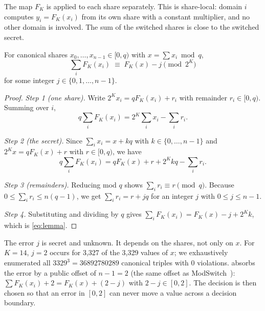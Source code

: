 The map $F_K$ is applied to each share separately. This is share-local: domain $i$ computes $y_i = F_K(x_i)$ from its own share with a constant multiplier, and no other domain is involved. The sum of the switched shares is close to the switched secret.
\begin{lemma}\label{lem:switch}
For canonical shares $x_0, \dots, x_{n-1} \in [0, q)$ with $x = \sum x_i \bmod q$,
\begin{equation}\label{eq:lemma}
  \sum_{i} F_K(x_i) \;\equiv\; F_K(x) - j \pmod{2^K}
\end{equation}
for some integer $j \in \{0, 1, \dots, n-1\}$.
\end{lemma}
\begin{proof}
\emph{Step 1 (one share).} Write $2^K x_i = q F_K(x_i) + r_i$ with remainder $r_i \in [0, q)$. Summing over $i$,
\[ q \textstyle\sum_i F_K(x_i) = 2^K \sum_i x_i - \sum_i r_i . \]

\emph{Step 2 (the secret).} Since $\sum_i x_i = x + kq$ with $k \in \{0, \dots, n-1\}$ and $2^K x = q F_K(x) + r$ with $r \in [0, q)$, we have
\[ q \textstyle\sum_i F_K(x_i) = q F_K(x) + r + 2^K k q - \sum_i r_i . \]

\emph{Step 3 (remainders).} Reducing mod $q$ shows $\sum_i r_i \equiv r \pmod q$. Because $0 \le \sum_i r_i \le n(q-1)$, we get $\sum_i r_i = r + jq$ for an integer $j$ with $0 \le j \le n - 1$.

\emph{Step 4.} Substituting and dividing by $q$ gives $\sum_i F_K(x_i) = F_K(x) - j + 2^K k$, which is \cref{eq:lemma}.
\end{proof}
The error $j$ is secret and unknown. It depends on the shares, not only on $x$. For $K = 14$, $j = 2$ occurs for 3,327 of the 3,329 values of $x$; we exhaustively enumerated all $3329^3 = \num{36892780289}$ canonical triples with 0 violations. \PAMS{} absorbs the error by a public offset of $n - 1 = 2$ (the same offset as ModSwitch~\cite{coron2023dil}): $\sum F_K(x_i) + 2 = F_K(x) + (2 - j)$ with $2 - j \in [0, 2]$. The decision is then chosen so that an error in $[0, 2]$ can never move a value across a decision boundary.

